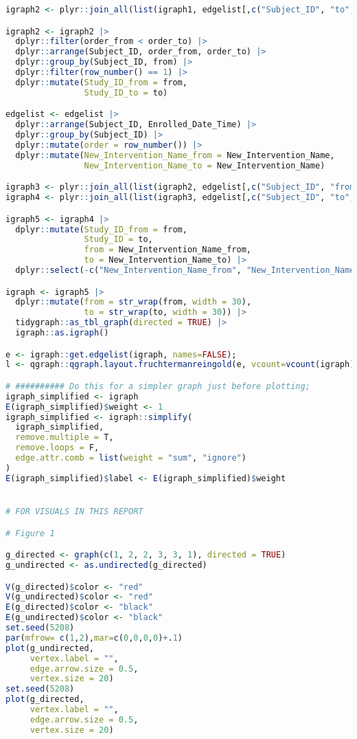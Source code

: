 \documentclass{article}
\begin{document}
\begin{lstlisting}[language=R]
igraph2 <- plyr::join_all(list(igraph1, edgelist[,c("Subject_ID", "to", "order_to")]), by=c("Subject_ID", "to"), type='left');

igraph2 <- igraph2 |>
  dplyr::filter(order_from < order_to) |>
  dplyr::arrange(Subject_ID, order_from, order_to) |>
  dplyr::group_by(Subject_ID, from) |>
  dplyr::filter(row_number() == 1) |>
  dplyr::mutate(Study_ID_from = from,
                Study_ID_to = to) 

edgelist <- edgelist |>
  dplyr::arrange(Subject_ID, Enrolled_Date_Time) |>
  dplyr::group_by(Subject_ID) |>
  dplyr::mutate(order = row_number()) |>
  dplyr::mutate(New_Intervention_Name_from = New_Intervention_Name, 
                New_Intervention_Name_to = New_Intervention_Name)

igraph3 <- plyr::join_all(list(igraph2, edgelist[,c("Subject_ID", "from", "New_Intervention_Name_from")]), by=c("Subject_ID", "from"), type='left');
igraph4 <- plyr::join_all(list(igraph3, edgelist[,c("Subject_ID", "to", "New_Intervention_Name_to")]), by=c("Subject_ID", "to"), type='left');

igraph5 <- igraph4 |>
  dplyr::mutate(Study_ID_from = from,
                Study_ID = to,
                from = New_Intervention_Name_from,
                to = New_Intervention_Name_to) |>
  dplyr::select(-c("New_Intervention_Name_from", "New_Intervention_Name_to"))

igraph <- igraph5 |>
  dplyr::mutate(from = str_wrap(from, width = 30),
                to = str_wrap(to, width = 30)) |>
  tidygraph::as_tbl_graph(directed = TRUE) |>
  igraph::as.igraph()

e <- igraph::get.edgelist(igraph, names=FALSE);
l <- qgraph::qgraph.layout.fruchtermanreingold(e, vcount=vcount(igraph), area=30*(vcount(igraph)^2),repulse.rad=(vcount(igraph)^2.1));

# ########## Do this for a simpler graph just before plotting;
igraph_simplified <- igraph
E(igraph_simplified)$weight <- 1
igraph_simplified <- igraph::simplify(
  igraph_simplified,
  remove.multiple = T,
  remove.loops = F,
  edge.attr.comb = list(weight = "sum", "ignore")
)
E(igraph_simplified)$label <- E(igraph_simplified)$weight


# FOR VISUALS IN THIS REPORT

# Figure 1

g_directed <- graph(c(1, 2, 2, 3, 3, 1), directed = TRUE)
g_undirected <- as.undirected(g_directed)

V(g_directed)$color <- "red"
V(g_undirected)$color <- "red"
E(g_directed)$color <- "black"
E(g_undirected)$color <- "black"
set.seed(5208)
par(mfrow= c(1,2),mar=c(0,0,0,0)+.1)
plot(g_undirected,
     vertex.label = "",
     edge.arrow.size = 0.5,
     vertex.size = 20)
set.seed(5208)
plot(g_directed,
     vertex.label = "",
     edge.arrow.size = 0.5,
     vertex.size = 20)


\end{lstlisting}
\end{document}
